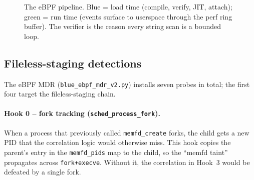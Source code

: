 \documentclass[11pt]{article}
\newcommand{\co}[1]{\texttt{#1}}
\begin{document}
\begin{figure}[ht]
\centering
{}
\caption{The eBPF pipeline. Blue = load time (compile, verify, JIT, attach);
green = run time (events surface to userspace through the perf ring buffer).
The verifier is the reason every string scan is a bounded loop.}
\label{fig:pipeline}
\end{figure}

\subsection{Fileless-staging detections}
The eBPF MDR (\co{blue\_ebpf\_mdr\_v2.py}) installs seven probes in total;
the first four target the fileless-staging chain.

\paragraph{Hook 0 -- fork tracking (\co{sched\_process\_fork}).}
When a process that previously called \co{memfd\_create} forks, the child
gets a new PID that the correlation logic would otherwise miss. This hook
copies the parent's entry in the \co{memfd\_pids} map to the child, so the
``memfd taint'' propagates across \co{fork+execve}. Without it, the
correlation in Hook~3 would be defeated by a single fork.
\end{document}
